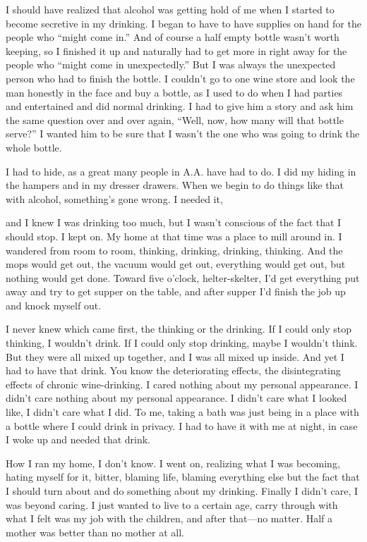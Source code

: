 \begin{biblechapter}
I should have realized that alcohol was getting hold of me when I started to become secretive in my drinking. I began to have to have supplies on hand for the people who “might come in.” And of course a half empty bottle wasn’t worth keeping, so I finished it up and naturally had to get more in right away for the people who “might come in unexpectedly.” But I was always the unexpected person who had to finish the bottle. I couldn’t go to one wine store and look the man honestly in the face and buy a bottle, as I used to do when I had parties and entertained and did normal drinking. I had to give him a story and ask him the same question over and over again, “Well, now, how many will that bottle serve?” I wanted him to be sure that I wasn’t the one who was going to drink the whole bottle.

I had to hide, as a great many people in A.A. have had to do. I did my hiding in the hampers and in my dresser drawers. When we begin to do things like that with alcohol, something’s gone wrong. I needed it,

and I knew I was drinking too much, but I wasn’t conscious of the fact that I should stop. I kept on. My home at that time was a place to mill around in. I wandered from room to room, thinking, drinking, drinking, thinking. And the mops would get out, the vacuum would get out, everything would get out, but nothing would get done. Toward five o’clock, helter-skelter, I’d get everything put away and try to get supper on the table, and after supper I’d finish the job up and knock myself out.

I never knew which came first, the thinking or the drinking. If I could only stop thinking, I wouldn’t drink. If I could only stop drinking, maybe I wouldn’t think. But they were all mixed up together, and I was all mixed up inside. And yet I had to have that drink. You know the deteriorating effects, the disintegrating effects of chronic wine-drinking. I cared nothing about my personal appearance. I didn’t care nothing about my personal appearance. I didn’t care what I looked like, I didn’t care what I did. To me, taking a bath was just being in a place with a bottle where I could drink in privacy. I had to have it with me at night, in case I woke up and needed that drink.

How I ran my home, I don’t know. I went on, realizing what I was becoming, hating myself for it, bitter, blaming life, blaming everything else but the fact that I should turn about and do something about my drinking. Finally I didn’t care, I was beyond caring. I just wanted to live to a certain age, carry through with what I felt was my job with the children, and after that—no matter. Half a mother was better than no mother at all.


\end{biblechapter}
